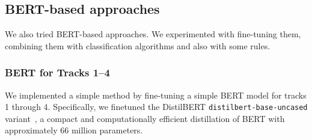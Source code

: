 \documentclass[11pt]{article}
\begin{document}

\subsection{BERT-based approaches}

We also tried BERT-based approaches.
We experimented with fine-tuning them, combining them with classification algorithms and also with some rules. 

\subsubsection{BERT for Tracks 1--4}

We implemented a simple method by fine-tuning a simple BERT model for tracks 1 through 4. 
Specifically, we finetuned the DistilBERT \texttt{distilbert-base-uncased} variant~\cite{sanh2020distilbert}, a compact and computationally efficient distillation of BERT with approximately 66 million parameters.
\end{document}
